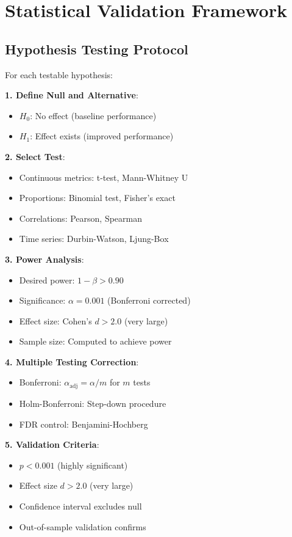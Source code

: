 \documentclass[12pt]{article}
\begin{document}
\section{Statistical Validation Framework}

\subsection{Hypothesis Testing Protocol}

For each testable hypothesis:

\textbf{1. Define Null and Alternative}:
\begin{itemize}
    \item $H_0$: No effect (baseline performance)
    \item $H_1$: Effect exists (improved performance)
\end{itemize}

\textbf{2. Select Test}:
\begin{itemize}
    \item Continuous metrics: t-test, Mann-Whitney U
    \item Proportions: Binomial test, Fisher's exact
    \item Correlations: Pearson, Spearman
    \item Time series: Durbin-Watson, Ljung-Box
\end{itemize}

\textbf{3. Power Analysis}:
\begin{itemize}
    \item Desired power: $1 - \beta > 0.90$
    \item Significance: $\alpha = 0.001$ (Bonferroni corrected)
    \item Effect size: Cohen's $d > 2.0$ (very large)
    \item Sample size: Computed to achieve power
\end{itemize}

\textbf{4. Multiple Testing Correction}:
\begin{itemize}
    \item Bonferroni: $\alpha_{\text{adj}} = \alpha / m$ for $m$ tests
    \item Holm-Bonferroni: Step-down procedure
    \item FDR control: Benjamini-Hochberg
\end{itemize}

\textbf{5. Validation Criteria}:
\begin{itemize}
    \item $p < 0.001$ (highly significant)
    \item Effect size $d > 2.0$ (very large)
    \item Confidence interval excludes null
    \item Out-of-sample validation confirms
\end{itemize}
\end{document}
